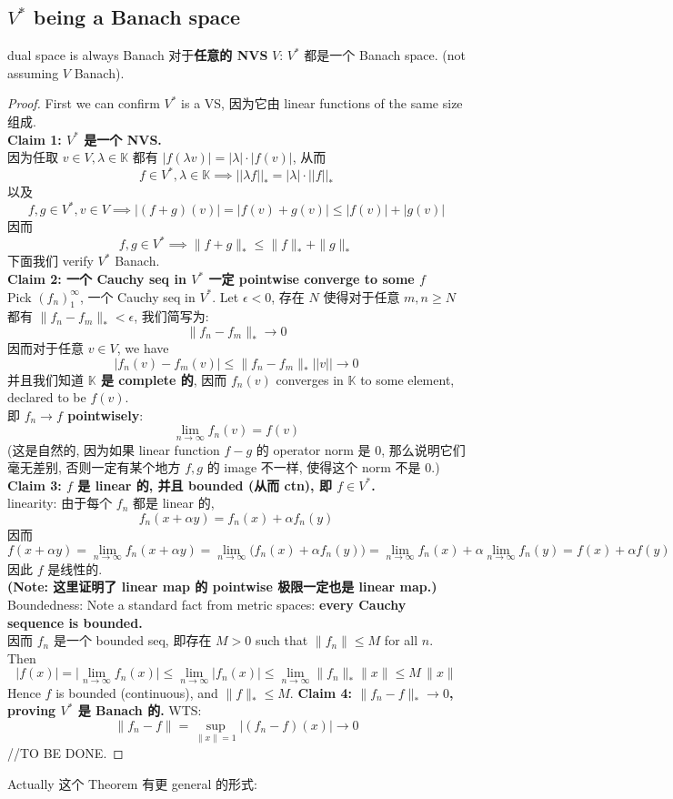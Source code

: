 \documentclass[lang=cn,11pt]{elegantbook}
\begin{document}
\subsection{$V^*$ being a Banach space}
\begin{theorem}{dual space is always Banach}
对于\textbf{任意的 NVS }$V$: $V^*$ 都是一个 Banach space. (not assuming $V$ Banach).
\end{theorem}
\begin{proof}
First we can confirm $V^*$ is a VS, 因为它由 linear functions of the same size 组成. \\
\textbf{Claim 1: $V^*$ 是一个 NVS.}\\
因为任取 $v\in V,\lambda\in\mathbb{K}$ 都有 $|f(\lambda v)| = |\lambda|\cdot |f(v)|$, 从而
\[
f \in V^* ,\lambda \in \mathbb{K}        \implies ||\lambda f||_* = |\lambda| \cdot ||f||_*
\]以及 \[
f,g\in V^*, v\in V \implies |(f+g) (v)| = |f(v) + g(v)|  \leq |f(v)| + |g(v)|
\]因而
\[
f,g\in V^* \implies \|f+g\|_* \leq \|f\|_* + \|g\|_*
\]
下面我们 verify $V^*$ Banach.\\
\textbf{Claim 2: 一个 Cauchy seq in $V^*$ 一定 pointwise converge to some $f 
$}\\
    Pick $(f_n)_1^\infty$, 一个 Cauchy seq in $V^*$. Let $\epsilon < 0$, 存在 $N$ 使得对于任意 $m,n \geq N$ 都有 \( \| f_n - f_m \|_* < \epsilon\), 我们简写为: \[ \|f_n - f_m\|_*  \to 0   \]
因而对于任意 $v\in V$,  we have \[
    |f_n(v) - f_m(v) | \leq \|f_n - f_m\|_*  ||v|| \to 0
    \]
并且我们知道\textbf{ $\mathbb{K}$ 是 complete 的}, 因而 $f_n(v)$ converges in $\mathbb{K}$ to some element, declared to be $f(v)$.\\
即 \textbf{\(f_n \to f \) pointwisely}:\[
    \lim _{n\to \infty} f_n (v )  = f(v)
    \]
(这是自然的, 因为如果 linear function $f-g$ 的 operator norm 是 $0$, 那么说明它们毫无差别, 否则一定有某个地方 $f,g$ 的 image 不一样, 使得这个 norm 不是 $0$.)\\
\textbf{Claim 3: $f$ 是 linear 的, 并且 bounded (从而 ctn), 即 $f\in V^*$. }\\
linearity: 由于每个 \(f_n\) 都是 linear 的, \[
      f_n(x + \alpha y) = f_n(x) + \alpha f_n(y)
      \]
因而 \[
      f(x + \alpha y) 
      = \lim_{n\to\infty} f_n(x+\alpha y) 
      = \lim_{n\to\infty}\bigl(f_n(x) + \alpha f_n(y)\bigr)
      = \lim_{n\to\infty}f_n(x) + \alpha \lim_{n\to\infty}f_n(y)
      = f(x) + \alpha f(y)\]
    因此 \(f\) 是线性的.\\
\textbf{ (Note: 这里证明了 linear map 的 pointwise 极限一定也是 linear map.)}\\
Boundedness: 
Note a standard fact from metric spaces: \textbf{every Cauchy sequence is bounded.}\\
因而 $f_n$ 是一个 bounded seq, 即存在 \(M>0\) such that \(\|f_n\| \le M\) for all \(n\). Then   \[
   |f(x)| = \big|\lim_{n\to\infty} f_n(x)\big|
            \le \lim_{n\to\infty} |f_n(x)|
            \le \lim_{n\to\infty} \|f_n\|_* \|x\|
            \le  M\,\|x\|
   \]
   Hence \(f\) is bounded (continuous), and \(\|f\|_* \le M\).
\textbf{Claim 4: $   \|f_n - f\|_*  \to 0$, proving $V^*$ 是 Banach 的.}
WTS:   \[
   \|f_n - f\| 
   = \sup_{\|x\|=1} |(f_n - f)(x) | \to 0
   \]
//TO BE DONE.
\end{proof}
Actually 这个 Theorem 有更 general 的形式: 
\end{document}
